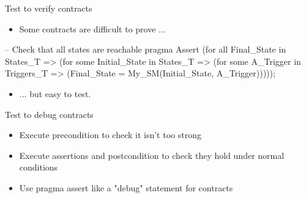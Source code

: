 \documentclass{beamer}
\begin{document}
\begin{frame}[fragile]{Test to verify contracts}
  \begin{itemize}
     \item Some contracts are difficult to prove ...
  \end{itemize}

  \begin{pxcode}[language=SPARK,style=magic,gobble=3]

      -- Check that all states are reachable
      pragma Assert
        (for all Final_State in States_T =>
           (for some Initial_State in States_T =>
                (for some A_Trigger in Triggers_T =>
                     (Final_State = My_SM(Initial_State, A_Trigger)))));
  \end{pxcode}

  \begin{itemize}
     \item ... but easy to test.
  \end{itemize}

\end{frame}

\begin{frame}[fragile]{Test to debug contracts}
  \begin{itemize}
     \item Execute precondition to check it isn't too strong
     \item Execute assertions and postcondition to check they hold under normal conditions
     \item Use pragma assert like a "debug" statement for contracts
  \end{itemize}
\end{frame}
\end{document}
